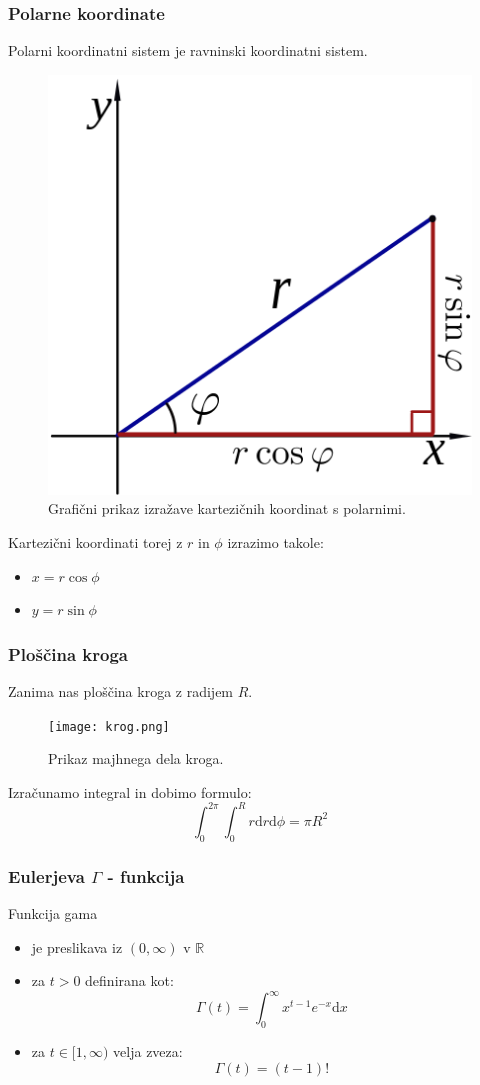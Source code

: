 \documentclass{beamer}
\theoremstyle{plain}
\begin{document}
\begin{frame}
\frametitle{Polarne koordinate}
Polarni koordinatni sistem je ravninski koordinatni sistem.

\begin{figure}[h!]
\centering
\includegraphics[width=.3\textwidth]{polarne_koordinate.png}
\caption{Grafični prikaz izražave kartezičnih koordinat s polarnimi.}
\end{figure}

\pause

Kartezični koordinati torej z $r$ in $\phi$ izrazimo takole:
\begin{itemize}
\item $x=r \cos \phi$
\item $y=r \sin \phi$
\end{itemize}
\end{frame}


\begin{frame}
\frametitle{Ploščina kroga}

Zanima nas ploščina kroga z radijem $R$.


\begin{figure}[h!]
\centering
\texttt{[image: krog.png]}
\caption{Prikaz majhnega dela kroga.}
\end{figure}

\pause

Izračunamo integral in dobimo formulo: $$\int^{2\pi}_{0} \int^{R}_{0} r \mathrm{d} r \mathrm{d} \phi = \pi R^2$$
\end{frame}

\begin{frame}
\frametitle{Eulerjeva $\Gamma$ - funkcija}
Funkcija gama
\pause
\begin{itemize}
\item je preslikava iz $(0, \infty)$ v $\mathbb{R}$
\pause
\item za $t>0$ definirana kot: $$\Gamma(t)=\int^{\infty}_{0} x^{t-1}e^{-x} \mathrm{d} x $$
\pause
\item za $t \in [1, \infty) $ velja zveza: 
$$ \Gamma (t) = (t-1)! $$
\end{itemize}

\end{frame}
\end{document}
